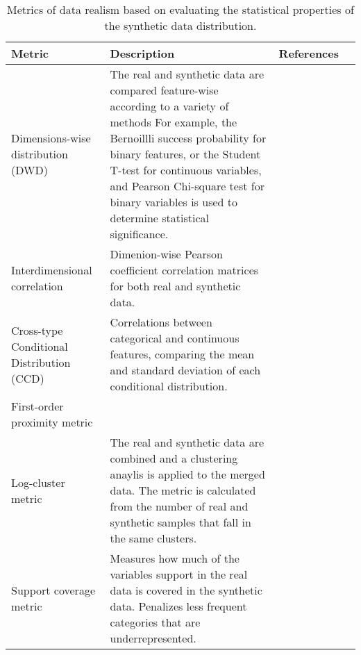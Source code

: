     \begin{table}
        \footnotesize
        \caption{Metrics of data realism based on evaluating the statistical properties of the synthetic data distribution. \label{tab:statistical}} 
        
        \begin{tabular}{@{} p{} p{} p{} p{} @{}}\toprule
            Metric & Description & References\\ \midrule
            
            Dimensions-wise distribution (DWD) & The real and synthetic data are compared feature-wise according to a variety of methods For example, the Bernoillli success probability for binary features, or the Student T-test for continuous variables, and Pearson Chi-square test for binary variables is used to determine statistical significance.& \cite{Beaulieu-Jones2019-ct,choi2017generating,chin2019generation,yan2020generating,Baowaly2019,Baowaly_2019,ozyigit2020generation,tanti2019, Yoon2020-anon}\\
            
            
            Interdimensional correlation & Dimenion-wise Pearson coefficient correlation matrices for both real and synthetic data. & \cite{Beaulieu-Jones2019-ct, Goncalves2020, torfi2019generating,Frid_Adar_2018,Yang_2019,ozyigit2020generation, Yang_2019_ehr, Yoon2020-anon}\\
           
            Cross-type Conditional Distribution (CCD) & Correlations between categorical and continuous features, comparing the mean and standard deviation of each conditional distribution. & \cite{yan2020generating}\\
            
            First-order proximity metric & {} & \cite{Zhang2020-wp}\\
            
            Log-cluster metric & The real and synthetic data are combined and a clustering anaylis is applied to the merged data. The metric is calculated from the number of real and synthetic samples that fall in the same clusters.  & \cite{Goncalves2020}\\
            
            Support coverage metric & Measures how much of the variables support in the real data is covered in the synthetic data. Penalizes less frequent categories that are underrepresented. & \cite{Goncalves2020}\\
            

\end{tabular}
\end{table}
